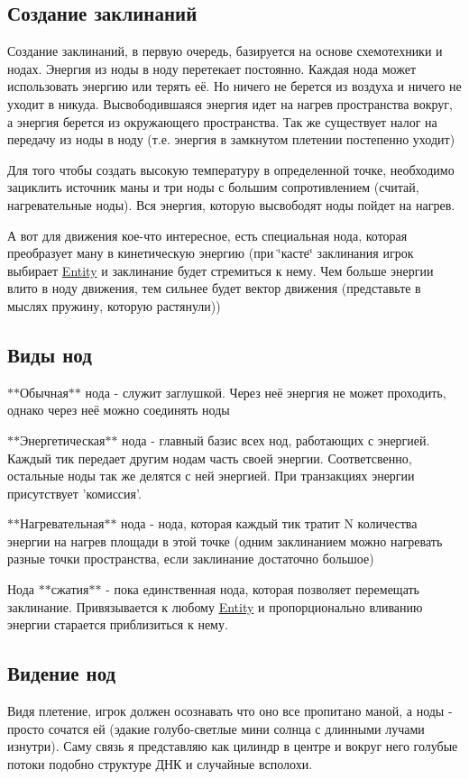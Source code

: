 \subsection*{Создание заклинаний}

Создание заклинаний, в первую очередь, базируется на основе схемотехники и нодах. Энергия из ноды в ноду перетекает постоянно. Каждая нода может использовать энергию или терять её. Но ничего не берется из воздуха и ничего не уходит в никуда. Высвободившаяся энергия идет на нагрев пространства вокруг, а энергия берется из окружающего пространства. Так же существует налог на передачу из ноды в ноду (т.\-е. энергия в замкнутом плетении постепенно уходит)

Для того чтобы создать высокую температуру в определенной точке, необходимо зациклить источник маны и три ноды с большим сопротивлением (считай, нагревательные ноды). Вся энергия, которую высвободят ноды пойдет на нагрев.

А вот для движения кое-\/что интересное, есть специальная нода, которая преобразует ману в кинетическую энергию (при \char`\"{}касте\char`\"{} заклинания игрок выбирает \hyperlink{class_entity}{Entity} и заклинание будет стремиться к нему. Чем больше энергии влито в ноду движения, тем сильнее будет вектор движения (представьте в мыслях пружину, которую растянули))

\subsection*{Виды нод}


\begin{DoxyItemize}
\item $\ast$$\ast$Обычная$\ast$$\ast$ нода -\/ служит заглушкой. Через неё энергия не может проходить, однако через неё можно соединять ноды
\item $\ast$$\ast$Энергетическая$\ast$$\ast$ нода -\/ главный базис всех нод, работающих с энергией. Каждый тик передает другим нодам часть своей энергии. Соответсвенно, остальные ноды так же делятся с ней энергией. При транзакциях энергии присутствует 'комиссия'.
\item $\ast$$\ast$Нагревательная$\ast$$\ast$ нода -\/ нода, которая каждый тик тратит N количества энергии на нагрев площади в этой точке (одним заклинанием можно нагревать разные точки пространства, если заклинание достаточно большое)
\item Нода $\ast$$\ast$сжатия$\ast$$\ast$ -\/ пока единственная нода, которая позволяет перемещать заклинание. Привязывается к любому \hyperlink{class_entity}{Entity} и пропорционально вливанию энергии старается приблизиться к нему.
\end{DoxyItemize}

\subsection*{Видение нод}

Видя плетение, игрок должен осознавать что оно все пропитано маной, а ноды -\/ просто сочатся ей (эдакие голубо-\/светлые мини солнца с длинными лучами изнутри). Саму связь я представляю как цилиндр в центре и вокруг него голубые потоки подобно структуре ДНК и случайные всполохи. 